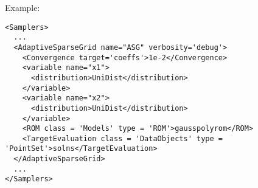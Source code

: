 Example:
\begin{lstlisting}[style=XML,morekeywords={class,limit,subGridTol,weight,persistence}]
<Samplers>
  ...
  <AdaptiveSparseGrid name="ASG" verbosity='debug'>
    <Convergence target='coeffs'>1e-2</Convergence>
    <variable name="x1">
      <distribution>UniDist</distribution>
    </variable>
    <variable name="x2">
      <distribution>UniDist</distribution>
    </variable>
    <ROM class = 'Models' type = 'ROM'>gausspolyrom</ROM>
    <TargetEvaluation class = 'DataObjects' type = 'PointSet'>solns</TargetEvaluation>
  </AdaptiveSparseGrid>
  ...
</Samplers>
\end{lstlisting}
